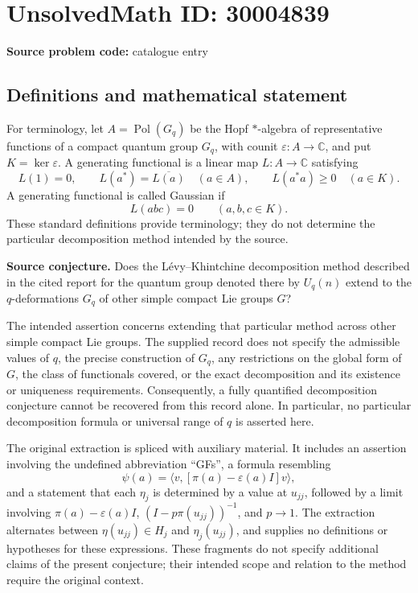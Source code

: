 \documentclass[11pt]{article}
\newcommand{\C}{\mathbb{C}}
\begin{document}
\section*{UnsolvedMath ID: 30004839}
\textbf{Source problem code:} catalogue entry
\subsection{Definitions and mathematical statement}
For terminology, let \(A=\operatorname{Pol}(G_q)\) be the Hopf \(*\)-algebra of representative functions of a compact quantum group \(G_q\), with counit \(\varepsilon:A\to\C\), and put \(K=\ker\varepsilon\). A generating functional is a linear map \(L:A\to\C\) satisfying
\[
L(1)=0,\qquad L(a^*)=\overline{L(a)}\quad(a\in A),\qquad L(a^*a)\geq0\quad(a\in K).
\]
A generating functional is called Gaussian if
\[
L(abc)=0\qquad(a,b,c\in K).
\]
These standard definitions provide terminology; they do not determine the particular decomposition method intended by the source.

\textbf{Source conjecture.} Does the L\'evy--Khintchine decomposition method described in the cited report for the quantum group denoted there by \(U_q(n)\) extend to the \(q\)-deformations \(G_q\) of other simple compact Lie groups \(G\)?

The intended assertion concerns extending that particular method across other simple compact Lie groups. The supplied record does not specify the admissible values of \(q\), the precise construction of \(G_q\), any restrictions on the global form of \(G\), the class of functionals covered, or the exact decomposition and its existence or uniqueness requirements. Consequently, a fully quantified decomposition conjecture cannot be recovered from this record alone. In particular, no particular decomposition formula or universal range of \(q\) is asserted here.

The original extraction is spliced with auxiliary material. It includes an assertion involving the undefined abbreviation ``GFs'', a formula resembling
\[
\psi(a)=\langle v,[\pi(a)-\varepsilon(a)I]v\rangle,
\]
and a statement that each \(\eta_j\) is determined by a value at \(u_{jj}\), followed by a limit involving \(\pi(a)-\varepsilon(a)I\), \((I-p\pi(u_{jj}))^{-1}\), and \(p\to1\). The extraction alternates between \(\eta(u_{jj})\in H_j\) and \(\eta_j(u_{jj})\), and supplies no definitions or hypotheses for these expressions. These fragments do not specify additional claims of the present conjecture; their intended scope and relation to the method require the original context.
\end{document}

